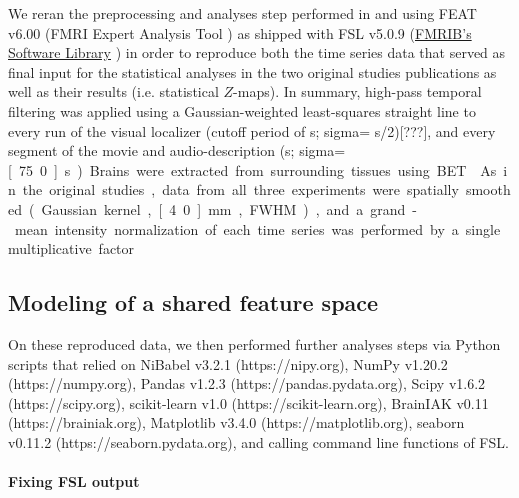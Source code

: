 %
We reran the preprocessing and analyses step performed in
\citet{sengupta2016extension} and \citet{haeusler2022processing} using FEAT
v6.00 (FMRI Expert Analysis Tool \citep{woolrich2001autocorr}) as shipped with
FSL v5.0.9 (\href{https://www.fmrib.ox.ac.uk/fsl}{FMRIB's Software Library}
\citep{smith2004fsl}) in order to reproduce both the time series data that
served as final input for the statistical analyses in the two original studies
publications as well as their results (i.e. statistical $Z$-maps).
In summary, high-pass temporal filtering was applied using a Gaussian-weighted
least-squares straight line to every run of the visual localizer (cutoff period
of \unit[100]{s}; sigma= \unit[100]{s}/2)[???], and every segment of the movie
and audio-description (\unit[150]{s}; sigma=\unit[75.0]{s}).
Brains were extracted from surrounding tissues using BET \citep{smith2002bet}.
As in the original studies, data from all three experiments were spatially
smoothed (Gaussian kernel, \unit[4.0]{mm}, FWHM), and a grand-mean intensity
normalization of each time series was performed by a single multiplicative
factor.




\subsection{Modeling of a shared feature space}


On these reproduced data, we then performed further analyses steps via
Python scripts that relied on
%
NiBabel v3.2.1 (https://nipy.org),
%
NumPy v1.20.2 (https://numpy.org),
%
Pandas v1.2.3 (https://pandas.pydata.org),
%
Scipy v1.6.2 (https://scipy.org),
%
scikit-learn v1.0 (https://scikit-learn.org),
%
BrainIAK v0.11 (https://brainiak.org),
%
Matplotlib v3.4.0 (https://matplotlib.org),
%
seaborn v0.11.2 (https://seaborn.pydata.org),
%
and calling command line functions of FSL.

\paragraph{Fixing FSL output}

